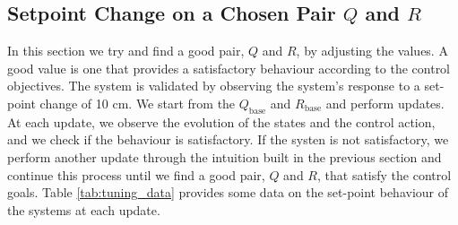 \documentclass[a4paper,10pt]{article}
\theoremstyle{bluehomework}
\numberwithin{equation}{section}
\begin{document}
\FloatBarrier

\subsection{Setpoint Change on a Chosen Pair $Q$ and $R$}

In this section we try and find a good pair, $Q$ and $R$, by adjusting the values. A good value is one that provides a satisfactory behaviour according to the control objectives. The system is validated by observing the system's response to a set-point change of 10 cm. We start from the $Q_{\text{base}}$ and $R_{\text{base}}$ and perform updates. At each update, we observe the evolution of the states and the control action, and we check if the behaviour is satisfactory. If the systen is not satisfactory, we perform another update through the intuition built in the previous section and continue this process until we find a good pair, $Q$ and $R$, that satisfy the control goals. Table \ref{tab:tuning_data} provides some data on the set-point behaviour of the systems at each update.
\medskip
\end{document}
